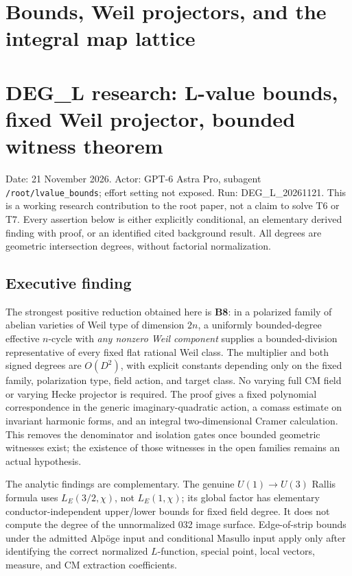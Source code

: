 \documentclass[11pt,a4paper]{article}
\providecommand{\tightlist}{\setlength{\itemsep}{0pt}\setlength{\parskip}{0pt}}
\theoremstyle{definition}
\begin{document}
\section{Bounds, Weil projectors, and the integral map lattice}

\providecommand{\tightlist}{\setlength{\itemsep}{0pt}\setlength{\parskip}{0pt}}
\section{DEG\_L research: L-value bounds, fixed Weil projector, bounded witness theorem}\label{deg_l-research-l-value-bounds-fixed-weil-projector-bounded-witness-theorem}

Date: 21 November 2026. Actor: GPT-6 Astra Pro, subagent \texttt{/root/lvalue\_bounds}; effort setting not exposed. Run: DEG\_L\_20261121. This is a working research contribution to the root paper, not a claim to solve T6 or T7. Every assertion below is either explicitly conditional, an elementary derived finding with proof, or an identified cited background result. All degrees are geometric intersection degrees, without factorial normalization.

\subsection{Executive finding}\label{executive-finding}

The strongest positive reduction obtained here is \textbf{B8}: in a polarized family of abelian varieties of Weil type of dimension \(2n\), a uniformly bounded-degree effective \(n\)-cycle with \emph{any nonzero Weil component} supplies a bounded-division representative of every fixed flat rational Weil class. The multiplier and both signed degrees are \(O(D^2)\), with explicit constants depending only on the fixed family, polarization type, field action, and target class. No varying full CM field or varying Hecke projector is required. The proof gives a fixed polynomial correspondence in the generic imaginary-quadratic action, a comass estimate on invariant harmonic forms, and an integral two-dimensional Cramer calculation. This removes the denominator and isolation gates once bounded geometric witnesses exist; the existence of those witnesses in the open families remains an actual hypothesis.

The analytic findings are complementary. The genuine \(U(1)\to U(3)\) Rallis formula uses \(L_E(3/2,\chi)\), not \(L_E(1,\chi)\); its global factor has elementary conductor-independent upper/lower bounds for fixed field degree. It does not compute the degree of the unnormalized 032 image surface. Edge-of-strip bounds under the admitted Alpöge input and conditional Masullo input apply only after identifying the correct normalized \(L\)-function, special point, local vectors, measure, and CM extraction coefficients.
\end{document}
